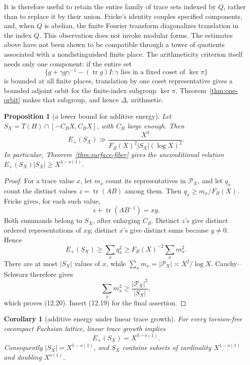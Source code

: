 \documentclass[11pt,reqno]{amsart}
\newtheorem{proposition}[theorem]{Proposition}
\newtheorem{corollary}[theorem]{Corollary}
\theoremstyle{definition}
\theoremstyle{remark}
\newcommand{\Tr}{\operatorname{tr}}
\begin{document}
It is therefore useful to retain the entire family of trace sets indexed by
\(Q\), rather than to replace it by their union.  Fricke's identity couples
specified components, and, when \(Q\) is abelian, the finite Fourier
transform diagonalizes translation in the index \(Q\).  This observation
does not invoke modular forms.  The estimates above have not been shown to
be compatible through a tower of quotients associated with a
nondistinguished finite place.  The arithmeticity criterion itself needs
only one component: if the entire set
\[
 \{g+\gamma g\gamma^{-1}-(\Tr g)I:
       \gamma\text{ lies in a fixed coset of }\ker\pi\}
\]
is bounded at all finite places, translation by one coset representative
gives a bounded adjoint orbit for the finite-index subgroup \(\ker\pi\).
Theorem~\ref{thm:one-orbit} makes that subgroup, and hence \(\Delta\),
arithmetic.

\begin{proposition}[a lower bound for additive energy]
\label{prop:energy-extraction}
Let \(S_X=T(H)\cap[-C_BX,C_BX]\), with \(C_B\) large enough.  Then
\[
 E_+(S_X)\gg
 \frac{X^4}{F_B(X)^2|S_X|(\log X)^2}.
\tag{12.20}
\]
In particular, Theorem~\ref{thm:surface-fiber} gives the unconditional
relation \(E_+(S_X)|S_X|\ge X^{4-o(1)}\).
\end{proposition}

\begin{proof}
For a trace value \(x\), let \(m_x\) count its representatives in
\(\mathcal P_X\), and let \(q_x\) count the distinct values
\(z=\Tr(AB)\) among them.  Then \(q_x\ge m_x/F_B(X)\).  Fricke gives, for
each such value,
\[
 z+\Tr(AB^{-1})=xy.
\]
Both summands belong to \(S_X\), after enlarging \(C_B\).  Distinct \(z\)'s
give distinct ordered representations of \(xy\); distinct \(x\)'s give
distinct sums because \(y\ne0\).  Hence
\[
 E_+(S_X)\ge\sum_xq_x^2
 \ge F_B(X)^{-2}\sum_xm_x^2.
\]
There are at most \(|S_X|\) values of \(x\), while
\(\sum_xm_x=|\mathcal P_X|\asymp X^2/\log X\).  Cauchy--Schwarz therefore
gives
\[
 \sum_xm_x^2\ge\frac{|\mathcal P_X|^2}{|S_X|},
\]
which proves (12.20).  Insert (12.19) for the final assertion.
\end{proof}

\begin{corollary}[additive energy under linear trace growth]
\label{cor:unconditional-energy}
For every torsion-free cocompact Fuchsian lattice, linear trace growth
implies
\[
 E_+(S_X)=X^{3-o(1)}.
\tag{12.21}
\]
Consequently \(|S_X|=X^{1-o(1)}\), and \(S_X\) contains subsets of
cardinality \(X^{1-o(1)}\) and doubling \(X^{o(1)}\).
\end{corollary}
\end{document}
